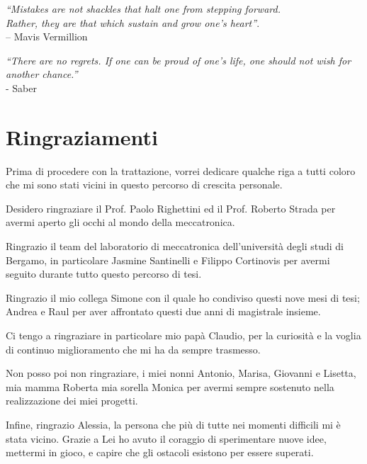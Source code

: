 \begin{flushright}

    \par   %
    \vspace{3\baselineskip}
    \textit{“Mistakes are not shackles that halt one from stepping forward. \\Rather, they are that which sustain and grow one’s heart”}. \\– Mavis Vermillion

\par
\vspace{3\baselineskip}
\textit{“There are no regrets. If one can be proud of one’s life, one should not wish for another chance.”} \\ - Saber

\end{flushright}
\vfill
\section*{Ringraziamenti}
Prima di procedere con la trattazione, vorrei dedicare qualche riga a tutti coloro che mi sono stati vicini in questo percorso di crescita personale.
\par Desidero ringraziare il Prof. Paolo Righettini ed il Prof. Roberto Strada per avermi aperto gli occhi al mondo della meccatronica.
\par Ringrazio il team del laboratorio di meccatronica dell'università degli studi di Bergamo, in particolare Jasmine Santinelli e Filippo Cortinovis per avermi seguito durante tutto questo percorso di tesi.
\par Ringrazio il mio collega Simone con il quale ho condiviso questi nove mesi di tesi; Andrea e Raul per aver affrontato questi due anni di magistrale insieme.
\par Ci tengo a ringraziare in particolare mio papà Claudio, per la curiosità e la voglia di continuo miglioramento che mi ha da sempre trasmesso.
\par Non posso poi non ringraziare, i miei nonni Antonio, Marisa, Giovanni e Lisetta, mia mamma Roberta mia sorella Monica per avermi sempre sostenuto nella realizzazione dei miei progetti.
\par Infine, ringrazio Alessia, la persona che più di tutte nei momenti difficili mi è stata vicino. Grazie a Lei ho avuto il coraggio di sperimentare nuove idee, mettermi in gioco, e capire che gli ostacoli esistono per essere superati.